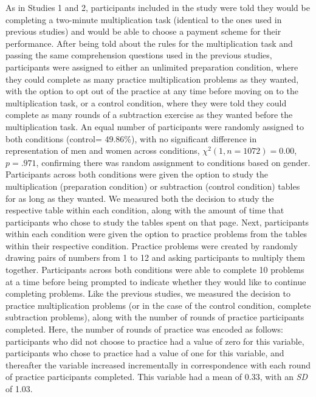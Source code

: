 \documentclass[a4paper, nobind]{templates/ociamthesis}
\begin{document}
As in Studies 1 and 2, participants included in the study were told they would be completing a two-minute multiplication task (identical to the ones used in previous studies) and would be able to choose a payment scheme for their performance. After being told about the rules for the multiplication task and passing the same comprehension questions used in the previous studies, participants were assigned to either an unlimited preparation condition, where they could complete as many practice multiplication problems as they wanted, with the option to opt out of the practice at any time before moving on to the multiplication task, or a control condition, where they were told they could complete as many rounds of a subtraction exercise as they wanted before the multiplication task. An equal number of participants were randomly assigned to both conditions (control= 49.86\%), with no significant difference in representation of men and women across conditions, \(\chi^2(1, n = 1072) = 0.00\), \(p = .971\), confirming there was random assignment to conditions based on gender. Participants across both conditions were given the option to study the multiplication (preparation condition) or subtraction (control condition) tables for as long as they wanted. We measured both the decision to study the respective table within each condition, along with the amount of time that participants who chose to study the tables spent on that page. Next, participants within each condition were given the option to practice problems from the tables within their respective condition. Practice problems were created by randomly drawing pairs of numbers from 1 to 12 and asking participants to multiply them together. Participants across both conditions were able to complete 10 problems at a time before being prompted to indicate whether they would like to continue completing problems. Like the previous studies, we measured the decision to practice multiplication problems (or in the case of the control condition, complete subtraction problems), along with the number of rounds of practice participants completed. Here, the number of rounds of practice was encoded as follows: participants who did not choose to practice had a value of zero for this variable, participants who chose to practice had a value of one for this variable, and thereafter the variable increased incrementally in correspondence with each round of practice participants completed. This variable had a mean of 0.33, with an \emph{SD} of 1.03.
\end{document}
